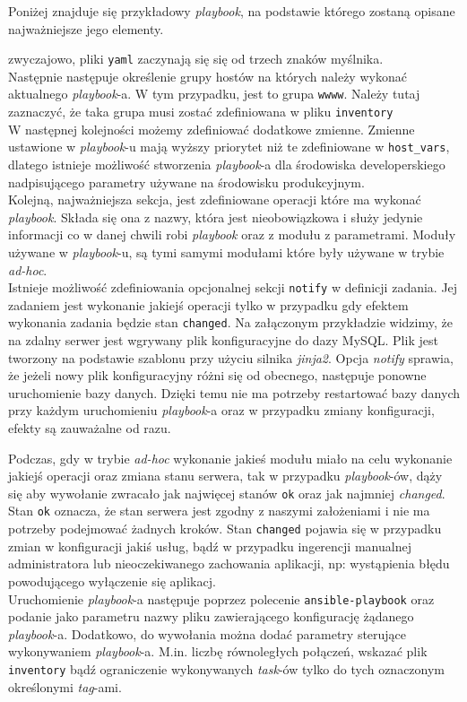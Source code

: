 Poniżej znajduje się przykładowy \textit{playbook}, na podstawie którego zostaną opisane najważniejsze jego elementy.

zwyczajowo, pliki \texttt{yaml} zaczynają się się od trzech znaków myślnika.\\
Następnie następuje określenie grupy hostów na których należy wykonać aktualnego \textit{playbook}-a.
W tym przypadku, jest to grupa \texttt{wwww}.
Należy tutaj zaznaczyć, że taka grupa musi zostać zdefiniowana w pliku \texttt{inventory}\\
W następnej kolejności możemy zdefiniować dodatkowe zmienne.
Zmienne ustawione w \textit{playbook}-u mają wyższy priorytet niż te zdefiniowane w \texttt{host\_vars}, dlatego istnieje możliwość stworzenia \textit{playbook}-a dla środowiska developerskiego nadpisującego parametry używane na środowisku produkcyjnym.\\
Kolejną, najważniejsza sekcja, jest zdefiniowane operacji które ma wykonać \textit{playbook}.
Składa się ona z nazwy, która jest nieobowiązkowa i służy jedynie informacji co w danej chwili robi \textit{playbook} oraz z modułu z parametrami.
Moduły używane w \textit{playbook}-u, są tymi samymi modułami które były używane w trybie \textit{ad-hoc}.\\
Istnieje możliwość zdefiniowania opcjonalnej sekcji \texttt{notify} w definicji zadania. Jej zadaniem jest wykonanie jakiejś operacji tylko w przypadku gdy efektem wykonania zadania będzie stan \texttt{changed}.
Na załączonym przykładzie widzimy, że na zdalny serwer jest wgrywany plik konfiguracyjne do dazy MySQL.
Plik jest tworzony na podstawie szablonu przy użyciu silnika \textit{jinja2}.
Opcja \textit{notify} sprawia, że jeżeli nowy plik konfiguracyjny różni się od obecnego, następuje ponowne uruchomienie bazy danych.
Dzięki temu nie ma potrzeby restartować bazy danych przy każdym uruchomieniu \textit{playbook}-a oraz w przypadku zmiany konfiguracji, efekty są zauważalne od razu.

Podczas, gdy w trybie \textit{ad-hoc} wykonanie jakieś modułu miało na celu wykonanie jakiejś operacji oraz zmiana stanu serwera, tak w przypadku \textit{playbook}-ów, dąży się aby wywołanie zwracało jak najwięcej stanów \texttt{ok} oraz jak najmniej \textit{changed}.
Stan \texttt{ok} oznacza, że stan serwera jest zgodny z naszymi założeniami i nie ma potrzeby podejmować żadnych kroków.
Stan \texttt{changed} pojawia się w przypadku zmian w konfiguracji jakiś usług, bądź w przypadku ingerencji manualnej administratora lub nieoczekiwanego zachowania aplikacji, np: wystąpienia błędu powodującego wyłączenie się aplikacj.\\
Uruchomienie \textit{playbook}-a następuje poprzez polecenie \texttt{ansible-playbook} oraz podanie jako parametru nazwy pliku zawierającego konfigurację żądanego \textit{playbook}-a.
Dodatkowo, do wywołania można dodać parametry sterujące wykonywaniem \textit{playbook}-a. M.in. liczbę równoległych połączeń, wskazać plik \texttt{inventory} bądź ograniczenie wykonywanych \textit{task}-ów tylko do tych oznaczonym określonymi \textit{tag}-ami.
